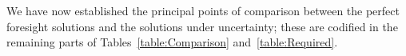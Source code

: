 \documentclass[\econtexRoot/BufferStockTheory]{subfiles}
\begin{document}

We have now established the principal points of comparison between the perfect foresight solutions and the solutions under uncertainty; these are codified in the remaining parts of Tables~\ref{table:Comparison} and~\ref{table:Required}.

\hypertarget{Factors-Defined-And-Compared}{}


\hypertarget{Required}{}

\end{document}
